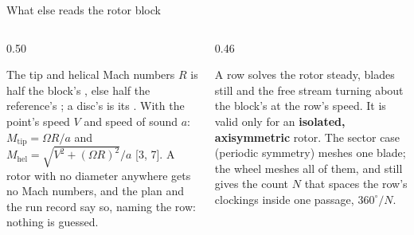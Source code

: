 \begin{frame}{What else reads the rotor block}
\begin{columns}[T]
\begin{column}{0.50\textwidth}
\begin{block}{The tip and helical Mach numbers}
\small \(R\) is half the block's , else half the
reference's ; a disc's is its
. With the point's speed \(V\) and speed of sound \(a\):
\(M_\mathrm{tip} = \Omega R / a\) and \(M_\mathrm{hel} =
\sqrt{V^2 + (\Omega R)^2}/a\) [3, 7]. A rotor with no diameter anywhere gets
no Mach numbers, and the plan and the run record say so, naming the row:
nothing is guessed.
\end{block}
\end{column}
\begin{column}{0.46\textwidth}
\begin{block}{A  row}
\small solves the rotor steady, blades still and the free stream turning
about the block's  at the row's speed. It is valid only for an
\textbf{isolated, axisymmetric} rotor. The sector case (periodic symmetry)
meshes one blade; the wheel meshes all of them, and
 still gives the count \(N\) that spaces the row's
 clockings inside one passage, \(360^\circ/N\).
\end{block}
\end{column}
\end{columns}
\end{frame}
